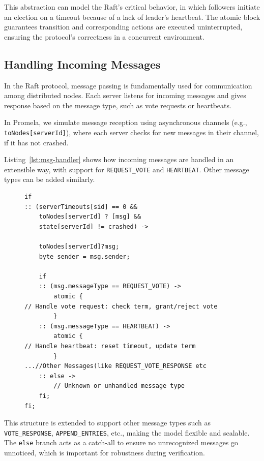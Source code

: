 \documentclass[a4paper]{llncs}
\begin{document}
This abstraction can model the Raft's critical behavior, in which followers initiate an election on a timeout because of a lack of leader's heartbeat. The atomic block guarantees transition and corresponding actions are executed uninterrupted, ensuring the protocol's correctness in a concurrent environment.






\subsection{Handling Incoming Messages}
\label{sec:incoming_messages}

In the Raft protocol, message passing is fundamentally used for communication among distributed nodes. Each server listens for incoming messages and gives response based on the message type, such as vote requests or heartbeats.

In Promela, we simulate message reception using asynchronous channels (e.g., \texttt{toNodes[serverId]}), where each server checks for new messages in their channel, if it has not crashed.

Listing~\ref{lst:msg-handler} shows how incoming messages are handled in an extensible way, with support for \texttt{REQUEST\_VOTE} and \texttt{HEARTBEAT}. Other message types can be added similarly.

\begin{figure}[htbp]
    \centering
    \begin{lstlisting}[style=promela, caption={Handling vote requests and heartbeats in Raft}, label={lst:msg-handler}]
if
:: (serverTimeouts[sid] == 0 &&
    toNodes[serverId] ? [msg] &&
    state[serverId] != crashed) ->

    toNodes[serverId]?msg;
    byte sender = msg.sender;

    if
    :: (msg.messageType == REQUEST_VOTE) ->
        atomic {
// Handle vote request: check term, grant/reject vote
        }
    :: (msg.messageType == HEARTBEAT) ->
        atomic {
// Handle heartbeat: reset timeout, update term
        }
...//Other Messages(like REQUEST_VOTE_RESPONSE etc
    :: else ->
        // Unknown or unhandled message type
    fi;
fi;
    \end{lstlisting}
\end{figure}

\noindent This structure is extended to support other message types such as \texttt{VOTE\_RESPONSE}, \texttt{APPEND\_ENTRIES}, etc., making the model flexible and scalable. The \texttt{else} branch acts as a catch-all to ensure no unrecognized messages go unnoticed, which is important for robustness during verification.
\end{document}

